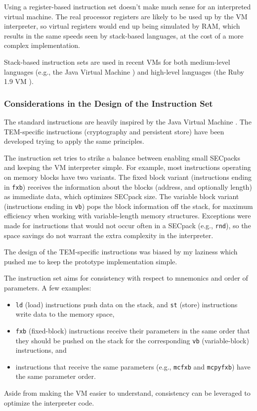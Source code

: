 Using a register-based instruction set doesn't make much sense for an
interpreted virtual machine. The real processor registers are likely to be used
up by the VM interpreter, so virtual registers would end up being simulated by
RAM, which results in the same speeds seen by stack-based languages, at the
cost of a more complex implementation.

Stack-based instruction sets are used in recent VMs for both medium-level
languages (e.g., the Java Virtual Machine \cite{lindholm1999jvm}) and high-level
languages (the Ruby 1.9 VM \cite{sasada2005yya}).

\subsubsection{Considerations in the Design of the Instruction
Set}\label{arch:vm_instructions}
The standard instructions are heavily inspired by the Java Virtual Machine
\cite{lindholm1999jvm}. The TEM-specific instructions (cryptography and
persistent store) have been developed trying to apply the same principles.

The instruction set tries to strike a balance between enabling small SECpacks
and keeping the VM interpreter simple. For example, most instructions operating
on memory blocks have two variants. The fixed block variant (instructions ending
in \texttt{fxb}) receives the information about the blocks (address, and
optionally length) as immediate data, which optimizes SECpack size. The
variable block variant (instructions ending in \texttt{vb}) pops the block
information off the stack, for maximum efficiency when working with
variable-length memory structures. Exceptions were made for instructions that
would not occur often in a SECpack (e.g., \texttt{rnd}), so the space savings
do not warrant the extra complexity in the interpreter.

The design of the TEM-specific instructions was biased by my laziness which
pushed me to keep the prototype implementation simple.

The instruction set aims for consistency with respect to mnemonics and
order of parameters. A few examples:
\begin{itemize}
  \item \texttt{ld} (load) instructions push data on the stack, and \texttt{st}
  (store) instructions write data to the memory space,
  \item \texttt{fxb} (fixed-block) instructions receive their parameters in the
  same order that they should be pushed on the stack for the corresponding
  \texttt{vb} (variable-block) instructions, and
  \item instructions that receive the same parameters (e.g., \texttt{mcfxb} and
  \texttt{mcpyfxb}) have the same parameter order.
\end{itemize}
Aside from making the VM easier to understand, consistency can be leveraged
to optimize the interpreter code.


